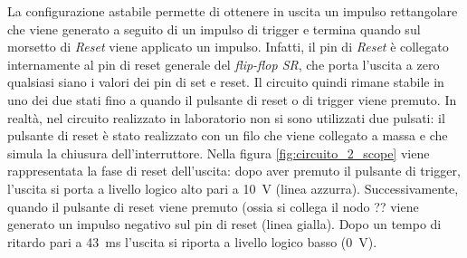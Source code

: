 \noindent
La configurazione astabile permette di ottenere in uscita un impulso rettangolare che viene generato a seguito di un impulso di trigger e termina quando sul morsetto di \textit{Reset} viene applicato un impulso. Infatti, il pin di \textit{Reset} è collegato internamente al pin di reset generale del \textit{flip-flop SR}, che porta l'uscita a zero qualsiasi siano i valori dei pin di set e reset. Il circuito quindi rimane stabile in uno dei due stati fino a quando il pulsante di reset o di trigger viene premuto. In realtà, nel circuito realizzato in laboratorio non si sono utilizzati due pulsati: il pulsante di reset è stato realizzato con un filo che viene collegato a massa e che simula la chiusura dell'interruttore.  Nella figura \ref{fig:circuito_2_scope} viene rappresentata la fase di reset dell'uscita: dopo aver premuto il pulsante di trigger, l'uscita si porta a livello logico alto pari a \SI{10}{\volt} (linea azzurra). Successivamente, quando il pulsante di reset viene premuto (ossia si collega il nodo ?? viene generato un impulso negativo sul pin di reset (linea gialla). Dopo un tempo di ritardo pari a \SI{43}{\milli\second} l'uscita si riporta a livello logico basso (\SI{0}{\volt}).
